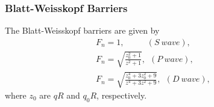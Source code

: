{    \subsubsection{Blatt-Weisskopf Barriers}{
        The Blatt-Weisskopf barriers are given by 
        \begin{equation}
            \begin{array}{lr}
                F_{n} = 1,       \ \ \ \ \ \ \ \ \ \ \ \   (S\ wave), &\\
                F_{n} = \sqrt{\frac{z_{0}^{2}+1}{z^{2}+1}},      \ \     (P\ wave), &\\
                F_{n} = \sqrt{\frac{z_{0}^{4}+3z_{0}^{2}+9}{z^{4}+3z^{2}+9}},   \ \      (D\ wave), &
            \end{array}\label{Blatt-Weisskopf barrier} 
        \end{equation}
        where $z_{0}$ are $qR$ and $q_{0}R$, respectively. 
    }

}
